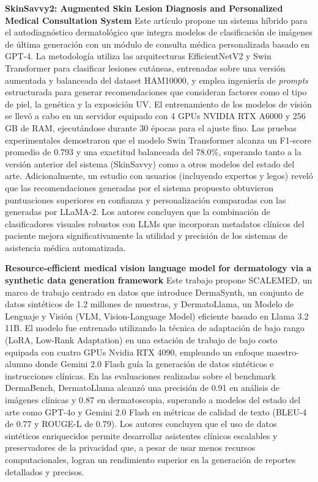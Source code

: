\documentclass[11pt, a4paper]{article}
\begin{document}
\textbf{SkinSavvy2: Augmented Skin Lesion Diagnosis and Personalized Medical Consultation System} \cite{kim_skinsavvy2_2025}
Este artículo propone un sistema híbrido para el autodiagnóstico dermatológico que integra modelos de clasificación de imágenes de última generación con un módulo de consulta médica personalizada basado en GPT-4. La 
metodología utiliza las arquitecturas EfficientNetV2 y Swin Transformer para clasificar lesiones cutáneas, entrenadas sobre una versión aumentada y balanceada del dataset HAM10000, y emplea ingeniería de \textit{prompts}
estructurada para generar recomendaciones que consideran factores como el tipo de piel, la genética y la exposición UV. El entrenamiento de los modelos de visión se llevó a cabo en un servidor equipado con 4 GPUs NVIDIA
RTX A6000 y 256 GB de RAM, ejecutándose durante 30 épocas para el ajuste fino. Las pruebas experimentales demostraron que el modelo Swin Transformer alcanza un F1-score promedio de 0.793 y una exactitud balanceada del 78.0\%,
superando tanto a la versión anterior del sistema (SkinSavvy) como a otros modelos del estado del arte. Adicionalmente, un estudio con usuarios (incluyendo expertos y legos) reveló que las recomendaciones generadas por el 
sistema propuesto obtuvieron puntuaciones superiores en confianza y personalización comparadas con las generadas por LLaMA-2. Los autores concluyen que la combinación de clasificadores visuales robustos con LLMs que incorporan
metadatos clínicos del paciente mejora significativamente la utilidad y precisión de los sistemas de asistencia médica automatizada.

\textbf{Resource-efficient medical vision language model for dermatology via a synthetic data generation framework} \cite{yilmaz_resource-efficient_nodate}
Este trabajo propone SCALEMED, un marco de trabajo centrado en datos que introduce DermaSynth, un conjunto de datos sintéticos de 1.2 millones de muestras, y DermatoLlama, un Modelo de Lenguaje y Visión (VLM, Vision-Language Model) 
eficiente basado en Llama 3.2 11B. El modelo fue entrenado utilizando la técnica de adaptación de bajo rango (LoRA, Low-Rank Adaptation) en una estación de trabajo de bajo costo equipada con cuatro GPUs Nvidia RTX 4090, empleando
un enfoque maestro-alumno donde Gemini 2.0 Flash guía la generación de datos sintéticos e instrucciones clínicas. En las evaluaciones realizadas sobre el benchmark DermaBench, DermatoLlama alcanzó una precisión de 0.91 en análisis
de imágenes clínicas y 0.87 en dermatoscopia, superando a modelos del estado del arte como GPT-4o y Gemini 2.0 Flash en métricas de calidad de texto (BLEU-4 de 0.77 y ROUGE-L de 0.79). Los autores concluyen que el uso de datos
sintéticos enriquecidos permite desarrollar asistentes clínicos escalables y preservadores de la privacidad que, a pesar de usar menos recursos computacionales, logran un rendimiento superior en la generación de reportes detallados
y precisos.
\end{document}
